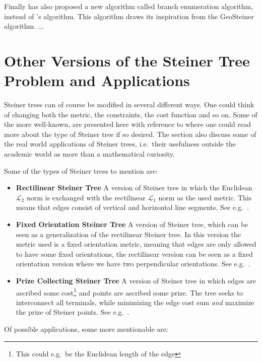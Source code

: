 Finally \textcite{fonseca2014} has also proposed a new algorithm called branch
enumeration algorithm, instead of \citeauthor{smith1992}'s algorithm. This
algorithm draws its inspiration from the GeoSteiner algorithm. ...

\section{Other Versions of the Steiner Tree Problem and Applications}
\label{sec:other-vers-stein}

Steiner trees can of course be modified in several different ways. One could
think of changing both the metric, the constraints, the cost function and so
on. Some of the more well-known, are presented here with reference to where one
could read more about the type of Steiner tree if so desired. The section also
discuss some of the real world applications of Steiner trees, i.e.\ their
usefulness outside the academic world as more than a mathematical curiosity.

Some of the types of Steiner trees to mention are:

\begin{itemize}
\item \textbf{Rectilinear Steiner Tree} \quad A version of Steiner tree in which
  the Euclidean $\mathcal{L}_2$ norm is exchanged with the rectilinear
  $\mathcal{L}_1$ norm as the used metric. This means that edges consist of
  vertical and horizontal line segments. See e.g.~\textcite[ch.~3]{brazil2015}.
\item \textbf{Fixed Orientation Steiner Tree} \quad A version of Steiner tree,
  which can be seen as a generalization of the rectilinear Steiner tree. In this
  version the metric used is a fixed orientation metric, meaning that edges are
  only allowed to have some fixed orientations, the rectilinear version can be
  seen as a fixed orientation version where we have two perpendicular
  orientations. See e.g.~\textcite[ch.~2]{brazil2015}.
\item \textbf{Prize Collecting Steiner Tree} \quad A version of Steiner tree in
  which edges are ascribed some cost\footnote{This could e.g.\ be the Euclidean
    length of the edge} and points are ascribed some prize. The tree seeks to
  interconnect all terminals, while minimizing the edge cost sum \textit{and}
  maximize the prize of Steiner points. See e.g.~\textcite{johnson2000}.
\end{itemize}

Of possible applications, some more mentionable are:

